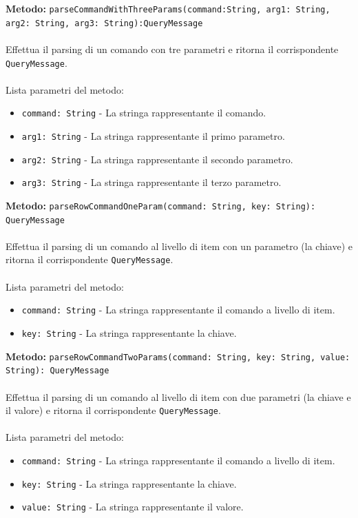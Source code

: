 \documentclass[a4paper]{article}
\begin{document}
			\textbf{Metodo: }\texttt{parseCommandWithThreeParams(command:String, arg1: String, arg2: String, arg3: String):QueryMessage}
			\\ \\
			Effettua il parsing di un comando con tre parametri e ritorna il corrispondente \texttt{QueryMessage}.
			\\ \\
			Lista parametri del metodo:
			\begin{itemize}
				\item \texttt{command: String} - La stringa rappresentante il comando.
				\item \texttt{arg1: String} - La stringa rappresentante il primo parametro.
				\item \texttt{arg2: String} - La stringa rappresentante il secondo parametro.
				\item \texttt{arg3: String} - La stringa rappresentante il terzo parametro.
			\end{itemize}
			\textbf{Metodo: }\texttt{parseRowCommandOneParam(command: String, key: String): QueryMessage}
			\\ \\
			Effettua il parsing di un comando al livello di item con un parametro (la chiave) e ritorna il corrispondente \texttt{QueryMessage}.
			\\ \\
			Lista parametri del metodo:
			\begin{itemize}
				\item \texttt{command: String} - La stringa rappresentante il comando a livello di item.
				\item \texttt{key: String} - La stringa rappresentante la chiave.
			\end{itemize}
			\textbf{Metodo: }\texttt{parseRowCommandTwoParams(command: String, key: String, value: String): QueryMessage}
			\\ \\
			Effettua il parsing di un comando al livello di item con due parametri (la chiave e il valore) e ritorna il corrispondente \texttt{QueryMessage}.
			\\ \\
			Lista parametri del metodo:
			\begin{itemize}
				\item \texttt{command: String} - La stringa rappresentante il comando a livello di item.
				\item \texttt{key: String} - La stringa rappresentante la chiave.
				\item \texttt{value: String} - La stringa rappresentante il valore.
			\end{itemize}
			
\end{document}
